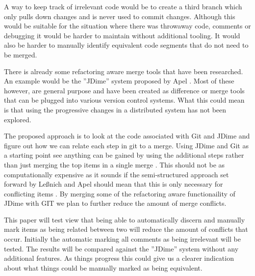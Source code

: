 \documentclass[12pt]{CRPITStyle}
\renewcommand{\cite}{\citep}
\begin{document}
A way to keep track of irrelevant code would be to create a third branch which only pulls down changes and is never used to commit changes. Although this would be suitable for the situation where there was throwaway code, comments or debugging it would be harder to maintain without additional tooling. It would also be harder to manually identify equivalent code segments that do not need to be merged.

There is already some refactoring aware merge tools that have been researched. An example would be the ''JDime'' system proposed by Apel \cite{Apel2011}. Most of these however, are general purpose and have been created as difference or merge tools that can be plugged into various version control systems. What this could mean is that using the progressive changes in a distributed system has not been explored.

The proposed approach is to look at the code associated with Git and JDime and figure out how we can relate each step in git to a merge. Using JDime and Git as a starting point see anything can be gained by using the additional steps rather than just merging the top items in a single merge . This should not be as computationally expensive as it sounds if the semi-structured approach set forward by Le{\ss}nich and Apel should mean that this is only necessary for conflicting items \cite{LeBenich2012} \cite{Apel2011}. By merging some of the refactoring aware functionaility of JDime with GIT we plan to further reduce the amount of merge conflicts. 

This paper will test view that being able to automatically discern and manually mark items as being related between two will reduce the amount of conflicts that occur. Initially the automatic marking all comments as being irrelevant will be tested. The results will be compared against the ''JDime'' system without any additional features. As things progress this could give us a clearer indication about what things could be manually marked as being equivalent.
\end{document}
